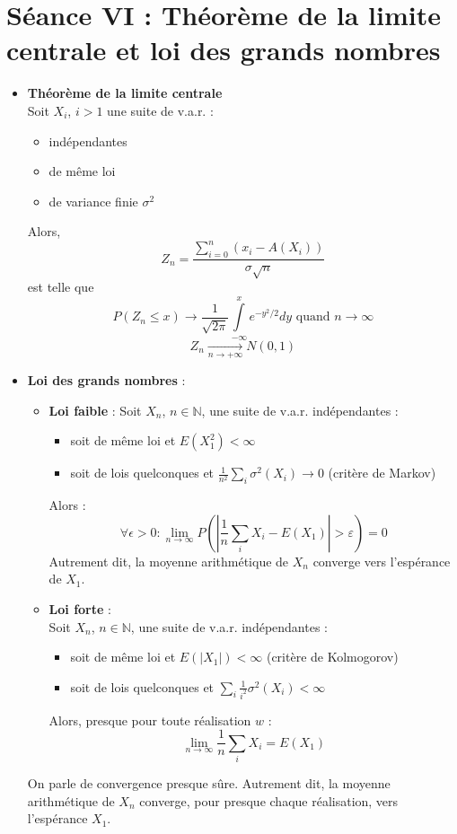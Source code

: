 \documentclass[a4paper,11pt]{report}
\begin{document}
\section{Séance VI : Théorème de la limite centrale et loi des grands nombres}
\begin{itemize}
	\item \textbf{Théorème de la limite centrale} \\
	Soit $X_i$, $i>1$ une suite de v.a.r. :
	\begin{itemize}
		\item indépendantes
		\item de même loi
		\item de variance finie $\sigma^2$
	\end{itemize}
	Alors,
	\[
		Z_n = \frac{\sum\limits_{i=0}^{n}{(x_i-A(X_i))}}{\sigma\sqrt{n}}
	\]
	est telle que
	\[
		P(Z_n \le x) \rightarrow
		\frac1{\sqrt{2\pi}}
		\int\limits_{-\infty}^{x}{e^{-y^2/2}dy}
		\text{ quand }n\rightarrow \infty
	\]
	\[
		Z_n \underset{n\to+\infty}{\longrightarrow} N(0,1)
	\]
	\item \textbf{Loi des grands nombres} :
	\begin{itemize}
		\item \textbf{Loi faible} :
		Soit $X_n$, $n \in \mathbb{N}$, une suite de v.a.r. indépendantes :
		\begin{itemize}
			\item soit de même loi et $E(X_1^2) < \infty$
			\item soit de lois quelconques et $\frac{1}{n^2}\sum\limits_{i}{\sigma^2(X_i) \rightarrow 0}$ (critère de Markov)
		\end{itemize}
		Alors :
		\[
			\forall \epsilon>0 : \lim\limits_{n\rightarrow \infty}
			{P\left(\left|\frac{1}{n}\sum\limits_{i}{X_i}-E(X_1)\right|
			>\varepsilon\right)} = 0
		\]
		Autrement dit, la moyenne arithmétique de $X_n$ converge vers l'espérance de $X_1$.
		\item \textbf{Loi forte} :\\
		Soit $X_n$, $n \in \mathbb{N}$, une suite de v.a.r. indépendantes :
		\begin{itemize}
			\item soit de même loi et $E(|X_1|) < \infty$ (critère de Kolmogorov)
			\item soit de lois quelconques et $\sum\limits_{i}{}\frac{1}{i^2}\sigma^2(X_i) < \infty$
		\end{itemize}
		Alors, presque pour toute réalisation $w$ :
		\[
			\lim\limits_{n \rightarrow \infty}
			\frac1n\sum\limits_i{X_i} = E(X_1)
		\]
	\end{itemize}
	On parle de convergence presque sûre.
	Autrement dit, la moyenne arithmétique de $X_n$ converge,
	pour presque chaque réalisation, vers l'espérance $X_1$.
\end{itemize}
\end{document}
